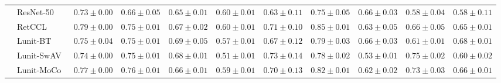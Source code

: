 \begin{tabular}{ll|cccc|c|cccc}
 & ResNet-50~\cite{he2015deep} & $0.73 \pm 0.00$ & $0.66 \pm 0.05$ & $0.65 \pm 0.01$ & $0.60 \pm 0.01$ & $0.63 \pm 0.11$ & $0.75 \pm 0.05$ & $0.66 \pm 0.03$ & $0.58 \pm 0.04$ & $0.58 \pm 0.11$ \\
 & RetCCL~\cite{wang2023retccl} & $0.79 \pm 0.00$ & $0.75 \pm 0.01$ & $0.67 \pm 0.02$ & $0.60 \pm 0.01$ & $0.71 \pm 0.10$ & $0.85 \pm 0.01$ & $0.63 \pm 0.05$ & $0.66 \pm 0.05$ & $0.65 \pm 0.01$ \\
 & Lunit-BT~\cite{kang2023benchmarking} & $0.75 \pm 0.04$ & $0.75 \pm 0.01$ & $0.69 \pm 0.05$ & $0.57 \pm 0.01$ & $0.67 \pm 0.12$ & $0.79 \pm 0.03$ & $0.66 \pm 0.03$ & $0.61 \pm 0.01$ & $\mathbf{0.68 \pm 0.01}$ \\
 & Lunit-SwAV~\cite{kang2023benchmarking} & $0.74 \pm 0.00$ & $0.75 \pm 0.01$ & $0.68 \pm 0.01$ & $0.51 \pm 0.01$ & $0.73 \pm 0.14$ & $0.78 \pm 0.02$ & $0.53 \pm 0.01$ & $0.75 \pm 0.02$ & $0.60 \pm 0.02$ \\
 & Lunit-MoCo~\cite{kang2023benchmarking} & $0.77 \pm 0.00$ & $0.76 \pm 0.01$ & $0.66 \pm 0.01$ & $0.59 \pm 0.01$ & $0.70 \pm 0.13$ & $0.82 \pm 0.01$ & $0.62 \pm 0.02$ & $0.73 \pm 0.03$ & $0.66 \pm 0.01$ \\
\cline{1-11}
\bottomrule
\end{tabular}
